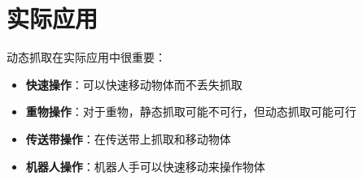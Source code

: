 \documentclass[12pt,a4paper]{article}
\begin{document}
\section{实际应用}

动态抓取在实际应用中很重要：

\begin{itemize}
    \item \textbf{快速操作}：可以快速移动物体而不丢失抓取
    \item \textbf{重物操作}：对于重物，静态抓取可能不可行，但动态抓取可能可行
    \item \textbf{传送带操作}：在传送带上抓取和移动物体
    \item \textbf{机器人操作}：机器人手可以快速移动来操作物体
\end{itemize}
\end{document}
